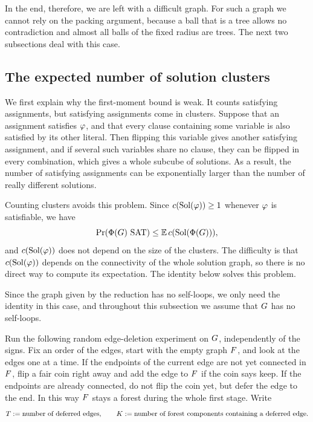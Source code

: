 In the end, therefore, we are left with a difficult graph. For such a graph we
cannot rely on the packing argument,
because a ball that is a tree allows no contradiction and almost all balls of
the fixed radius are trees. The next two subsections deal with this case.

\subsection{The expected number of solution clusters}\label{subsec:overview-main-identity}

We first explain why the first-moment bound is weak. It counts satisfying
assignments, but satisfying assignments come in clusters. Suppose that an
assignment satisfies \(\varphi\), and that every clause containing some variable
is also satisfied by its other literal. Then flipping this variable gives
another satisfying assignment, and if several such variables share no clause,
they can be flipped in every combination, which gives a whole subcube of
solutions. As a result, the number of satisfying assignments can be
exponentially larger than the number of really different solutions.

Counting clusters avoids this problem. Since \(c(\operatorname{Sol}(\varphi))\ge1\) whenever
\(\varphi\) is satisfiable, we have
\[
  \Prx{\rform{\Gin}\SAT}\le\E\,\solcomp{\rform{\Gin}},
\]
and \(c(\operatorname{Sol}(\varphi))\) does not depend on the size of the clusters. The
difficulty is that \(c(\operatorname{Sol}(\varphi))\) depends on the connectivity of the whole
solution graph, so there is no direct way to compute its expectation. The
identity below solves this problem.

Since the graph given by the reduction has no self-loops, we only need the
identity in this case, and throughout this subsection we assume that \(G\)
has no self-loops.

Run the following random edge-deletion experiment on \(G\), independently of
the signs. Fix an order of the edges, start with the empty graph \(F\), and
look at the edges one at a time. If the endpoints of the current edge are not
yet connected in \(F\), flip a fair coin right away and add the edge to
\(F\) if the coin says keep. If the endpoints are already connected, do not
flip the coin yet, but defer the edge to the end. In this way \(F\) stays a
forest during the whole first stage. Write
\[
  T:=\text{number of deferred edges},
  \qquad
  K:=\text{number of forest components containing a deferred edge}.
\]


